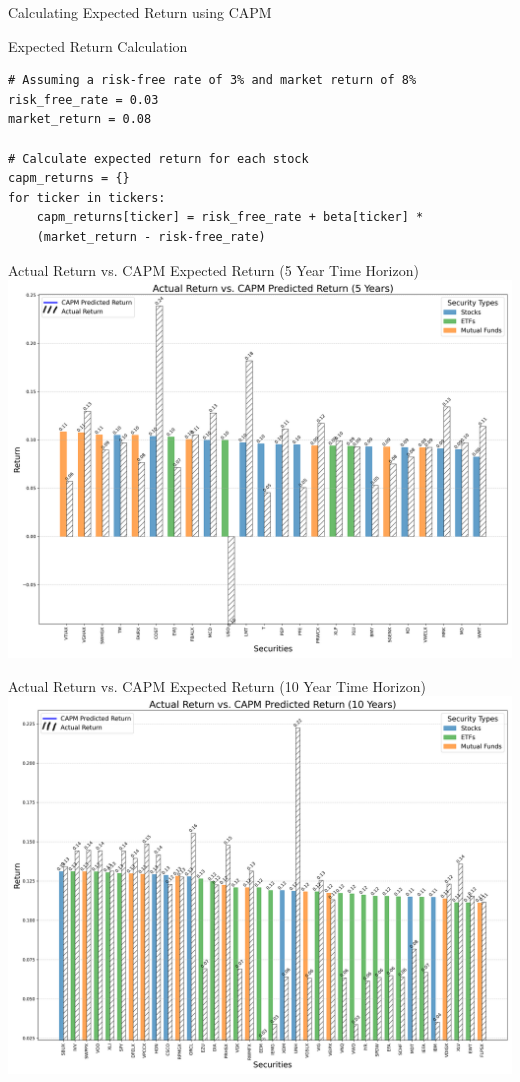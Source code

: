 \documentclass{beamer}
\begin{document}
\begin{frame}[fragile]{Calculating Expected Return using CAPM}
    \begin{block}{Expected Return Calculation}
        \begin{verbatim}
# Assuming a risk-free rate of 3% and market return of 8%
risk_free_rate = 0.03
market_return = 0.08

# Calculate expected return for each stock
capm_returns = {}
for ticker in tickers:
    capm_returns[ticker] = risk_free_rate + beta[ticker] * 
    (market_return - risk-free_rate)
        \end{verbatim}
    \end{block}
\end{frame}

\begin{frame}{Actual Return vs. CAPM Expected Return (5 Year Time Horizon)}
    \centering
    \includegraphics[height=0.8\textheight]{actual_vs_capm_5_years.png}
\end{frame}

\begin{frame}{Actual Return vs. CAPM Expected Return (10 Year Time Horizon)}
    \centering
    \includegraphics[height=0.8\textheight]{actual_vs_capm_10_years.png}
\end{frame}
\end{document}
